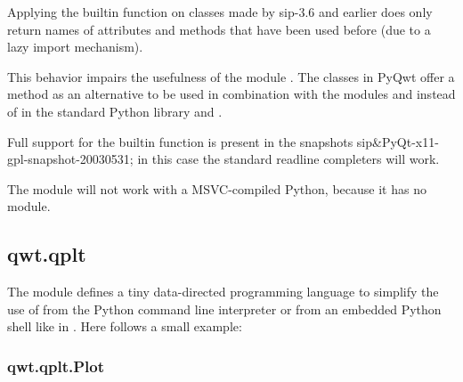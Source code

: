 \documentclass{manual}
\begin{document}
\begin{notice}[warning]
  Applying the builtin function  on classes made by sip-3.6
  and earlier does only return names of attributes and methods that have
  been used before (due to a lazy import mechanism).

  This behavior impairs the usefulness of the module .
  The classes in PyQwt offer a method  as an
  alternative to be used in combination with the modules
   and  instead of
   in the standard Python library and
  .

  Full support for the builtin function  is present in
  the snapshots sip\&PyQt-x11-gpl-snapshot-20030531; in this case the
  standard readline completers will work. 
\end{notice}

\begin{notice}[warning]
  The module  will not work with a MSVC-compiled Python, because
  it has no  module.
\end{notice}


\subsection{qwt.qplt \label{qwt-qplt}}

The module  defines a tiny data-directed programming
language to simplify the use of  from the Python command
line interpreter or from an embedded Python shell like in .
Here follows a small example:



\subsubsection{qwt.qplt.Plot \label{intro-qplt-plot}}
\end{document}
